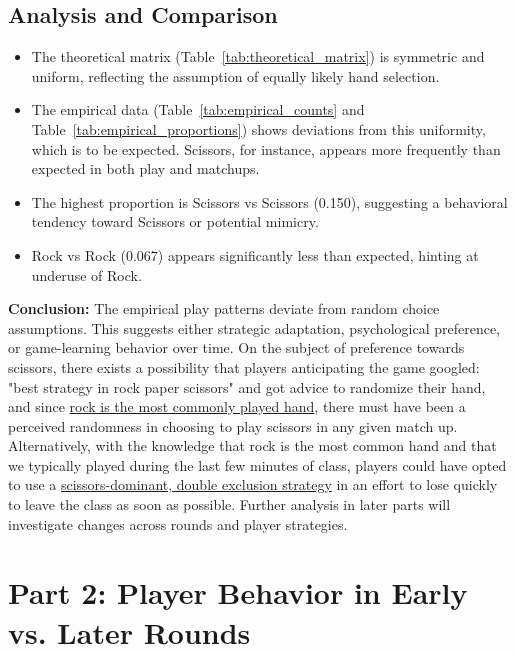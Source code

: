 \documentclass[12pt]{article}
\begin{document}
\subsection*{Analysis and Comparison}
\begin{itemize}
    \item The theoretical matrix (Table~\ref{tab:theoretical_matrix}) is symmetric and uniform, reflecting the assumption of equally likely hand selection.
    \item The empirical data (Table~\ref{tab:empirical_counts} and Table~\ref{tab:empirical_proportions}) shows deviations from this uniformity, which is to be expected. Scissors, for instance, appears more frequently than expected in both play and matchups.
    \item The highest proportion is Scissors vs Scissors (0.150), suggesting a behavioral tendency toward Scissors or potential mimicry.
    \item Rock vs Rock (0.067) appears significantly less than expected, hinting at underuse of Rock.
\end{itemize}

\noindent \textbf{Conclusion:} The empirical play patterns deviate from random choice assumptions. This suggests either strategic adaptation, psychological preference, or game-learning behavior over time. On the subject of preference towards scissors, there exists a possibility that players anticipating the game googled: "best strategy in rock paper scissors" and got advice to randomize their hand, and since \href{https://www.fishersci.com/us/en/education-products/publications/headline-discoveries/2025/spring-summer/rock-paper-scissors-science.html#:~:text=In%20RPS%2C%20each%20option%20has,paper%2C%20and%2026%20percent%20scissors.}{rock is the most commonly played hand}, there must have been a perceived randomness in choosing to play scissors in any given match up. Alternatively, with the knowledge that rock is the most common hand and that we typically played during the last few minutes of class, players could have opted to use a \href{https://wrpsa.com/the-worst-rock-paper-scissors-strategies/}{scissors-dominant, double exclusion strategy} in an effort to lose quickly to leave the class as soon as possible. Further analysis in later parts will investigate changes across rounds and player strategies.

\newpage

\section*{Part 2: Player Behavior in Early vs. Later Rounds}
\end{document}
